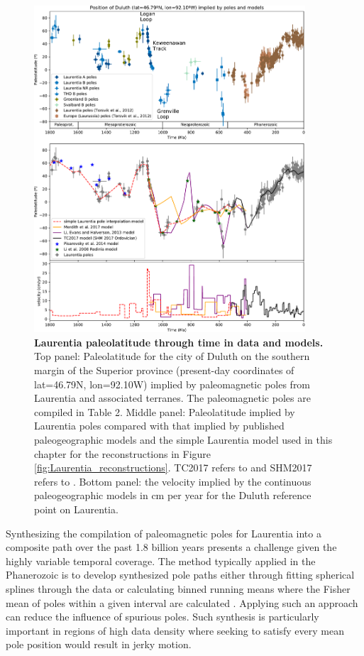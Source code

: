 \documentclass[twocolumn, switch]{article} %
\begin{document}
\begin{figure}
\centering
\includegraphics[width=0.9\textwidth]{../Figures/Fig5_Laurentia_paleolatitude.pdf}
\caption{\textbf{Laurentia paleolatitude through time in data and models.} Top panel: Paleolatitude for the city of Duluth on the southern margin of the Superior province (present-day coordinates of lat=46.79\textdegree N, lon=92.10\textdegree W) implied by paleomagnetic poles from Laurentia and associated terranes. The paleomagnetic poles are compiled in Table 2. Middle panel: Paleolatitude implied by Laurentia poles compared with that implied by published paleogeographic models and the simple Laurentia model used in this chapter for the reconstructions in Figure \ref{fig:Laurentia_reconstructions}. TC2017 refers to \cite{Torsvik2017a} and SHM2017 refers to \cite{Swanson-Hysell2017a}. Bottom panel: the velocity implied by the continuous paleogeographic models in cm per year for the Duluth reference point on Laurentia.}
\label{fig:Laurentia_paleolatitude}
\end{figure}

Synthesizing the compilation of paleomagnetic poles for Laurentia into a composite path over the past 1.8 billion years presents a challenge given the highly variable temporal coverage. The method typically applied in the Phanerozoic is to develop synthesized pole paths either through fitting spherical splines through the data or calculating binned running means where the Fisher mean of poles within a given interval are calculated \citep{Torsvik2012a}. Applying such an approach can reduce the influence of spurious poles. Such synthesis is particularly important in regions of high data density where seeking to satisfy every mean pole position would result in jerky motion.
\end{document}
